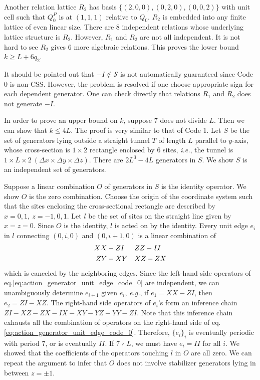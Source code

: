 \documentclass[letterpaper,10pt,pra,aps,showpacs,twocolumn]{revtex4-1}
\theoremstyle{definition} \newtheorem{defn}{Definition}
\theoremstyle{definition} \newtheorem{remark}{Remark}
\newcommand{\ie}{\emph{i.e.}}
\begin{document}
Another relation lattice $R_2$ has basis $\{ (2,0,0),(0,2,0),(0,0,2) \}$ with unit cell such that $Q_0^P$ is at $(1,1,1)$ relative to $Q_0$. $R_2$ is embedded into any finite lattice of even linear size. There are 8 independent relations whose underlying lattice structure is $R_2$. However, $R_1$ and $R_2$ are not all independent. It is not hard to see $R_2$ gives 6 more algebraic relations. This proves the lower bound $k \geq L + 6 q_2$.

It should be pointed out that $-I \notin \mathcal{S}$ is not automatically guaranteed since Code 0 is non-CSS. However, the problem is resolved if one choose appropriate sign for each dependent generator. One can check directly that relations $R_1$ and $R_2$ does not generate $-I$.

In order to prove an upper bound on $k$, suppose $7$ does not divide $L$. Then we can show that $ k \leq 4 L $. The proof is very similar to that of Code 1. Let $S$ be the set of generators lying outside a straight tunnel $T$ of length $L$ parallel to $y$-axis, whose cross-section is $1 \times 2$ rectangle enclosed by 6 sites, \ie, the tunnel is $1 \times L \times 2 ~ (\Delta x \times \Delta y \times \Delta z)$. There are $2 L^3 - 4 L$ generators in $S$. We show $S$ is an independent set of generators.

Suppose a linear combination $O$ of generators in $S$ is the identity operator. We show $O$ is the zero combination. Choose the origin of the coordinate system such that the sites enclosing the cross-sectional rectangle are described by $ x = 0,1,\ z=-1,0,1 $. Let $l$ be the set of sites on the straight line given by $ x=z=0$. Since $O$ is the identity, $l$ is acted on by the identity. Every unit edge $e_i$ in $l$ connecting $(0,i,0)$ and $(0,i+1,0)$ is a linear combination of
\begin{align}
 XX &- ZI & &
 ZZ - II  \notag \\
 ZY &- XY & &
 XZ - ZX \label{eq:action_generator_unit_edge_code_0}
\end{align}
which is canceled by the neighboring edges. Since the left-hand side operators of eq.\eqref{eq:action_generator_unit_edge_code_0} are independent, we can unambiguously determine $e_{i+1}$ given $e_i$, \emph{e.g.}, if $e_1 = XX - ZI$, then $e_2 = ZI - XZ$. The right-hand side operators of $e_i$'s form an inference chain $ZI - XZ - ZX - IX - XY - YZ - YY - ZI$. Note that this inference chain exhausts all the combination of operators on the right-hand side of eq.\eqref{eq:action_generator_unit_edge_code_0}. Therefore, $\{ e_i \}_i$ is eventually periodic with period 7, or is eventually $II$. If $7 \nmid L$, we must have $e_i = II$ for all $i$. We showed that the coefficients of the operators touching $l$ in $O$ are all zero. We can repeat the argument to infer that $O$ does not involve stabilizer generators lying in between $z=\pm 1$.
\end{document}
